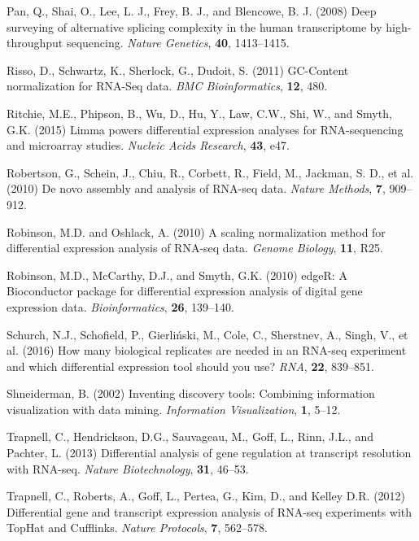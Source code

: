\documentclass{bioinfo}
\begin{document}
\begin{thebibliography}{}
Pan, Q., Shai, O., Lee, L. J., Frey, B. J., and Blencowe, B. J. (2008) Deep surveying of alternative splicing complexity in the human transcriptome by high-throughput sequencing. {\it Nature Genetics}, {\bf 40}, 1413--1415.

Risso, D., Schwartz, K., Sherlock, G., Dudoit, S. (2011) GC-Content normalization for RNA-Seq data. {\it BMC Bioinformatics}, {\bf 12}, 480.

Ritchie, M.E., Phipson, B., Wu, D., Hu, Y., Law, C.W., Shi, W., and Smyth, G.K. (2015) Limma powers differential expression analyses for RNA-sequencing and microarray studies. {\it Nucleic Acids Research}, {\bf 43}, e47.

Robertson, G., Schein, J., Chiu, R., Corbett, R., Field, M., Jackman, S. D., et al. (2010) De novo assembly and analysis of RNA-seq data. {\it Nature Methods}, {\bf 7}, 909--912.

Robinson, M.D. and Oshlack, A. (2010) A scaling normalization method for differential expression analysis of RNA-seq data. {\it Genome Biology}, {\bf 11}, R25.

Robinson, M.D., McCarthy, D.J., and Smyth, G.K. (2010) edgeR: A Bioconductor package for differential expression analysis of digital gene expression data. {\it Bioinformatics}, {\bf 26}, 139--140.

Schurch, N.J., Schofield, P., Gierliński, M., Cole, C., Sherstnev, A., Singh, V., et al. (2016) How many biological replicates are needed in an RNA-seq experiment and which differential expression tool should you use? {\it RNA}, {\bf 22}, 839--851.

Shneiderman, B. (2002) Inventing discovery tools: Combining information visualization with data mining. {\it Information Visualization}, {\bf 1}, 5--12.

Trapnell, C., Hendrickson, D.G., Sauvageau, M., Goff, L., Rinn, J.L., and Pachter, L. (2013) Differential analysis of gene regulation at transcript resolution with RNA-seq. {\it Nature Biotechnology}, {\bf 31}, 46--53.

Trapnell, C., Roberts, A., Goff, L., Pertea, G., Kim, D., and Kelley D.R. (2012) Differential gene and transcript expression analysis of RNA-seq experiments with TopHat and Cufflinks. {\it Nature Protocols}, {\bf 7}, 562--578.


\end{thebibliography}
\end{document}

